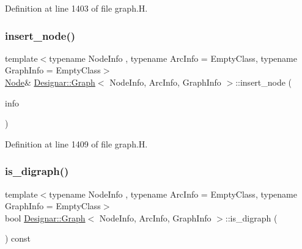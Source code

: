 Definition at line 1403 of file graph.\+H.

\mbox{\label{class_designar_1_1_graph_abbf6788c27f9719907d31fe7f7a83920}} 
\subsubsection{\texorpdfstring{insert\+\_\+node()}{insert\_node()}\hspace{0.1cm}{\footnotesize\ttfamily [4/4]}}
{\footnotesize\ttfamily template$<$typename Node\+Info , typename Arc\+Info  = Empty\+Class, typename Graph\+Info  = Empty\+Class$>$ \\
\hyperlink{class_designar_1_1_graph_a5dfc7dba9d092ac489c72e40390c37d0}{Node}\& \hyperlink{class_designar_1_1_graph}{Designar\+::\+Graph}$<$ Node\+Info, Arc\+Info, Graph\+Info $>$\+::insert\+\_\+node (\begin{DoxyParamCaption}\item[{Node\+Info \&\&}]{info }\end{DoxyParamCaption})\hspace{0.3cm}{\ttfamily [inline]}}



Definition at line 1409 of file graph.\+H.

\mbox{\label{class_designar_1_1_graph_af0e0b3d1d6a52e0f3d3225f1fa274211}} 
\subsubsection{\texorpdfstring{is\+\_\+digraph()}{is\_digraph()}}
{\footnotesize\ttfamily template$<$typename Node\+Info , typename Arc\+Info  = Empty\+Class, typename Graph\+Info  = Empty\+Class$>$ \\
bool \hyperlink{class_designar_1_1_graph}{Designar\+::\+Graph}$<$ Node\+Info, Arc\+Info, Graph\+Info $>$\+::is\+\_\+digraph (\begin{DoxyParamCaption}{ }\end{DoxyParamCaption}) const\hspace{0.3cm}{\ttfamily [inline]}}



